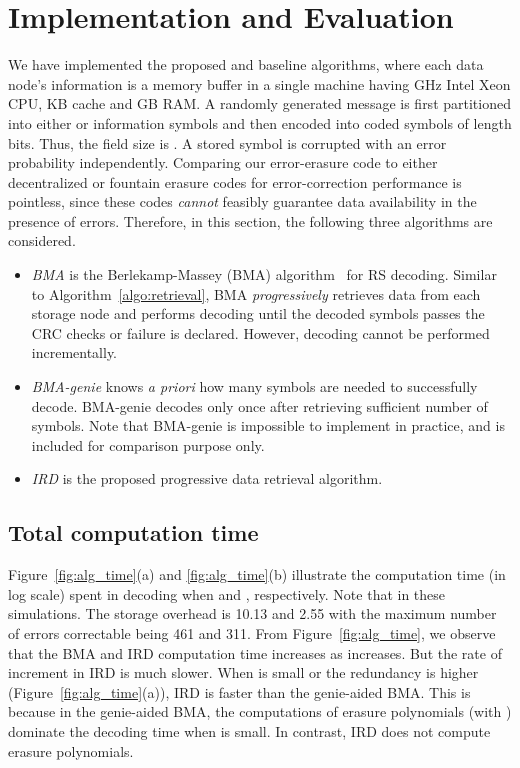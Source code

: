 \documentclass[10pt,journal,letterpaper,compsoc]{IEEEtran}
\newcommand{\0}{{\bf 0}}
\begin{document}
\section{Implementation and Evaluation}
\label{sect:eval}
We have implemented the proposed and baseline algorithms, where each data node's 
information is a memory buffer in a single machine having
 GHz Intel Xeon CPU,  KB cache and
 GB RAM. A randomly generated message is first
partitioned into either  or  information symbols and then encoded into  coded
symbols of length  bits. 
Thus, the field size is . A
stored symbol is corrupted with an error probability  independently.
Comparing our error-erasure code to either decentralized or fountain erasure codes for error-correction performance is pointless, since these codes
\emph{cannot} feasibly guarantee data availability in the presence of errors. Therefore, in this section, the following three algorithms are considered.
\begin{itemize}
\item{\it BMA} is the Berlekamp-Massey (BMA) algorithm~\cite{MOO05} for
RS decoding. Similar to Algorithm~\ref{algo:retrieval}, BMA {\it progressively}
retrieves data from each storage node and performs decoding until
the decoded symbols passes the CRC checks or failure is declared. However,
decoding cannot be performed incrementally. 
\item{\it BMA-genie} knows \emph{a priori} how many symbols are needed to
successfully decode. BMA-genie decodes only once after retrieving sufficient
number of symbols. Note that BMA-genie is impossible to implement in practice,
and is included for comparison purpose only.
\item{\it IRD} is the proposed progressive data retrieval algorithm. 
\end{itemize}
\begin{comment}
In place of BMA, either the Euclidean or Welch-Berlekamp algorithm could have been used. 
They have the same asymptotic time complexity. 
Figures~\ref{fig:alg_time} and \ref{fig:breakdown} show the time it takes to
correctly decode a data block. 
\end{comment}
\subsection{Total computation time}
Figure~\ref{fig:alg_time}(a) and \ref{fig:alg_time}(b) illustrate the computation time (in log scale)
spent in decoding when  and , respectively. Note that  in these simulations. The storage overhead
 is 10.13 and 2.55 with the maximum number of errors correctable being 461
and 311. From Figure~\ref{fig:alg_time}, we observe that the BMA and IRD
computation time increases  as  increases. But the rate of increment in
IRD is much slower. When  is small or the redundancy is higher
(Figure~\ref{fig:alg_time}(a)), IRD is faster than the genie-aided
BMA. This is because in the genie-aided BMA, the computations of erasure
polynomials (with ) dominate the decoding time when  is small.
In contrast, IRD does not compute erasure polynomials.
\end{document}
